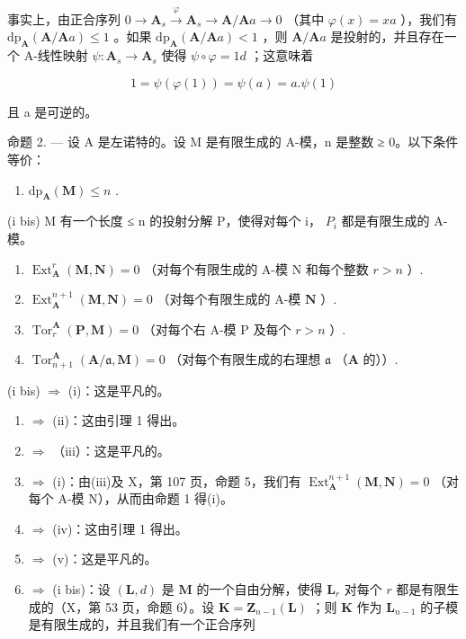 事实上，由正合序列 \(0 \to \mathbf{A}_s \xrightarrow{\varphi} \mathbf{A}_s \to \mathbf{A} / \mathbf{A}a \to 0\) （其中 \(\varphi(x) = xa\) ），我们有 \(\mathrm{dp}_{\mathbf{A}}(\mathbf{A} / \mathbf{A}a) \leqslant 1\) 。如果 \(\mathrm{dp}_{\mathbf{A}}(\mathbf{A} / \mathbf{A}a) < 1\) ，则 \(\mathbf{A} / \mathbf{A}a\) 是投射的，并且存在一个 A-线性映射 \(\psi : \mathbf{A}_s \to \mathbf{A}_s\) 使得 \(\psi \circ \varphi = 1d\) ；这意味着

\[
1 = \psi (\varphi (1)) = \psi (a) = a. \psi (1)
\]

且 a 是可逆的。

命题 2. --- 设 A 是左诺特的。设 M 是有限生成的 A-模，n 是整数 ≥ 0。以下条件等价：

\begin{enumerate}
\def\labelenumi{(\roman{enumi})}
\tightlist
\item
  \(\mathrm{dp}_{\mathbf{A}}(\mathbf{M}) \leqslant n\) .
\end{enumerate}

(i bis) M 有一个长度 ≤ n 的投射分解 P，使得对每个 i， \(P_{i}\) 都是有限生成的 A-模。

\begin{enumerate}
\def\labelenumi{(\roman{enumi})}
\setcounter{enumi}{1}
\item
  \(\operatorname{Ext}_{\mathbf{A}}^{r}(\mathbf{M},\mathbf{N}) = 0\) （对每个有限生成的 A-模 N 和每个整数 \(r > n\) ）.
\item
  \(\operatorname{Ext}_{\mathbf{A}}^{n+1}(\mathbf{M}, \mathbf{N}) = 0\) （对每个有限生成的 A-模 \(\mathbf{N}\) ）.
\item
  \(\operatorname{Tor}_r^{\mathbf{A}}(\mathbf{P},\mathbf{M}) = 0\) （对每个右 A-模 P 及每个 \(r > n\) ）.
\item
  \(\operatorname{Tor}_{n+1}^{\mathbf{A}}(\mathbf{A}/\mathfrak{a},\mathbf{M}) = 0\) （对每个有限生成的右理想 \(\mathfrak{a}\) （\(\mathbf{A}\) 的））.
\end{enumerate}

(i bis) \(\Rightarrow\) (i)：这是平凡的。

\begin{enumerate}
\def\labelenumi{(\roman{enumi})}
\item
  \(\Rightarrow\) (ii)：这由引理 1 得出。
\item
  \(\Rightarrow\) （iii）：这是平凡的。
\item
  \(\Rightarrow\) (i)：由(iii)及 X，第 107 页，命题 5，我们有 \(\operatorname{Ext}_{\mathbf{A}}^{n+1}(\mathbf{M}, \mathbf{N}) = 0\) （对每个 A-模 N），从而由命题 1 得(i)。
\item
  \(\Rightarrow\) (iv)：这由引理 1 得出。
\item
  \(\Rightarrow\) (v)：这是平凡的。
\item
  \(\Rightarrow\) (i bis)：设 \((\mathbf{L}, d)\) 是 \(\mathbf{M}\) 的一个自由分解，使得 \(\mathbf{L}_r\) 对每个 \(r\) 都是有限生成的（X，第 53 页，命题 6）。设 \(\mathbf{K} = \mathbf{Z}_{n-1}(\mathbf{L})\) ；则 \(\mathbf{K}\) 作为 \(\mathbf{L}_{n-1}\) 的子模是有限生成的，并且我们有一个正合序列
\end{enumerate}

